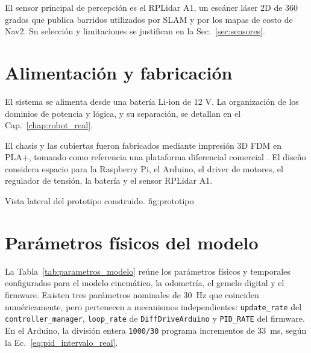El sensor principal de percepción es el RPLidar A1, un escáner láser 2D de 360 grados que publica barridos utilizados por SLAM y por los mapas de costo de Nav2. Su selección y limitaciones se justifican en la Sec.~\ref{sec:sensores}.

\section{Alimentación y fabricación}

El sistema se alimenta desde una batería Li-ion de 12 V. La organización de los dominios de potencia y lógica, y su separación, se detallan en el Cap.~\ref{chap:robot_real}.

El chasis y las cubiertas fueron fabricados mediante impresión 3D FDM en PLA+, tomando como referencia una plataforma diferencial comercial \citep{BECChassisLong}. El diseño considera espacio para la Raspberry Pi, el \gls{Arduino}, el driver de motores, el regulador de tensión, la batería y el sensor RPLidar A1.

{Vista lateral del prototipo construido.}
{fig:prototipo}

\section{Parámetros físicos del modelo}
\label{sec:parametros_modelo}

La Tabla~\ref{tab:parametros_modelo} reúne los parámetros físicos y temporales configurados para el modelo cinemático, la odometría, el gemelo digital y el firmware. Existen tres parámetros nominales de 30~Hz que coinciden numéricamente, pero pertenecen a mecanismos independientes: \texttt{update\_rate} del \texttt{controller\_manager}, \texttt{loop\_rate} de \texttt{DiffDriveArduino} y \texttt{PID\_RATE} del firmware. En el Arduino, la división entera \texttt{1000/30} programa incrementos de 33~ms, según la Ec.~\eqref{eq:pid_intervalo_real}.


